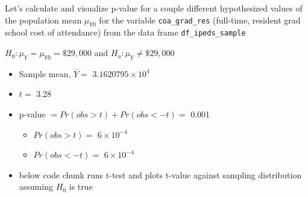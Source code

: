 \documentclass[
  letterpaper,
  DIV=11,
  numbers=noendperiod]{scrartcl}
\newenvironment{Shaded}{\begin{snugshade}}{\end{snugshade}}
\newcommand{\AttributeTok}[1]{\textcolor[rgb]{0.40,0.45,0.13}{#1}}
\newcommand{\CommentTok}[1]{\textcolor[rgb]{0.37,0.37,0.37}{#1}}
\newcommand{\DecValTok}[1]{\textcolor[rgb]{0.68,0.00,0.00}{#1}}
\newcommand{\FunctionTok}[1]{\textcolor[rgb]{0.28,0.35,0.67}{#1}}
\newcommand{\NormalTok}[1]{\textcolor[rgb]{0.00,0.23,0.31}{#1}}
\newcommand{\SpecialCharTok}[1]{\textcolor[rgb]{0.37,0.37,0.37}{#1}}
\providecommand{\tightlist}{%
  \setlength{\itemsep}{0pt}\setlength{\parskip}{0pt}}\usepackage{longtable,booktabs,array}
\begin{document}
Let's calculate and visualize p-value for a couple different
hypothesized values of the population mean \(\mu_{Y0}\) for the variable
\texttt{coa\_grad\_res} (full-time, resident grad school cost of
attendance) from the data frame \texttt{df\_ipeds\_sample}

\(H_0: \mu_Y = \mu_{Y0} = \$29,000\) and \(H_a: \mu_Y \neq \$29,000\)

\begin{itemize}
\tightlist
\item
  Sample mean, \(\bar{Y} =\) \ensuremath{3.1620795\times 10^{4}}
\item
  \(t =\) 3.28
\item
  p-value \(= Pr(obs > t) + Pr(obs< -t) =\) 0.001

  \begin{itemize}
  \tightlist
  \item
    \(Pr(obs>t)=\) \ensuremath{6\times 10^{-4}}
  \item
    \(Pr(obs<-t)=\) \ensuremath{6\times 10^{-4}}
  \end{itemize}
\item
  below code chunk runs t-test and plots t-value against sampling
  distribution assuming \(H_0\) is true
\end{itemize}

\begin{Shaded}
\end{Shaded}
\end{document}
